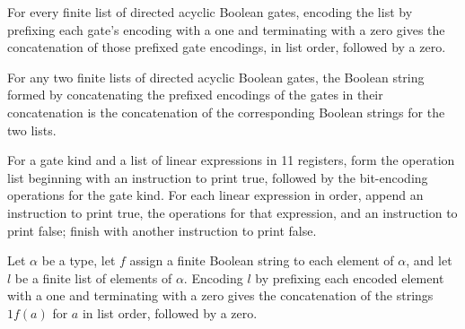 \begin{theorem}
\label{Complexity.UTab.encodeList_eq_gbits}
\leanok
{}
For every finite list of directed acyclic Boolean gates, encoding the list by prefixing
each gate’s encoding with a one and terminating with a zero gives the concatenation of
those prefixed gate encodings, in list order, followed by a zero.
\end{theorem}

\begin{theorem}
\label{Complexity.UTab.gbits_append}
\leanok
{}
For any two finite lists of directed acyclic Boolean gates, the Boolean string formed by
concatenating the prefixed encodings of the gates in their concatenation is the
concatenation of the corresponding Boolean strings for the two lists.
\end{theorem}

\begin{definition}
\label{Complexity.UTab.sgOps}
\leanok
{}
For a gate kind and a list of linear expressions in 11 registers, form the operation
list beginning with an instruction to print true, followed by the bit-encoding
operations for the gate kind. For each linear expression in order, append an instruction
to print true, the operations for that expression, and an instruction to print false;
finish with another instruction to print false.
\end{definition}

\begin{theorem}
\label{Complexity.UTab.encodeList_eq_flatMap}
\leanok
{}
Let $\alpha$ be a type, let $f$ assign a finite Boolean string to each element of
$\alpha$, and let $l$ be a finite list of elements of $\alpha$. Encoding $l$ by
prefixing each encoded element with a one and terminating with a zero gives the
concatenation of the strings $1f(a)$ for $a$ in list order, followed by a zero.
\end{theorem}

